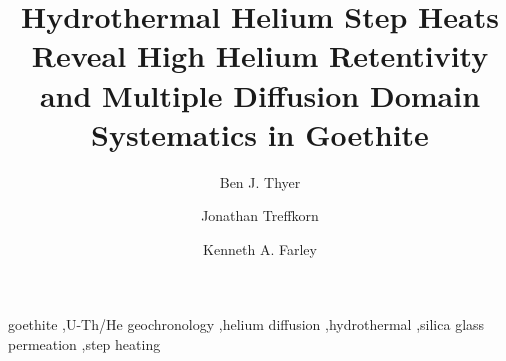 \documentclass[preprint,12pt,review,authoryear]{elsarticle}
\begin{document}
\linenumbers

\begin{frontmatter}

\title{Hydrothermal Helium Step Heats Reveal High Helium Retentivity and Multiple Diffusion Domain Systematics in Goethite}

\author[caltech]{Ben J. Thyer}
\author[caltech]{Jonathan Treffkorn}
\author[caltech]{Kenneth A. Farley}


\begin{abstract}

\end{abstract}

\begin{keyword}
goethite \sep U-Th/He geochronology \sep helium diffusion \sep hydrothermal \sep silica glass permeation \sep step heating
\end{keyword}

\end{frontmatter}





\end{document}
